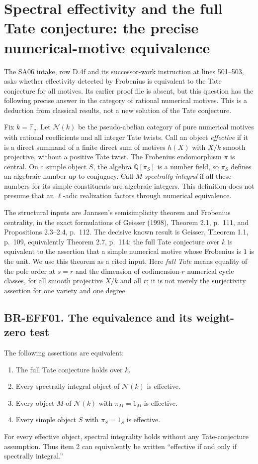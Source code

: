 \documentclass[11pt,a4paper]{article}
\theoremstyle{definition}\newtheorem{definition}[theorem]{Definition}
\theoremstyle{remark}\newtheorem{remark}[theorem]{Remark}
\begin{document}
\section{Spectral effectivity and the full Tate conjecture: the precise numerical-motive equivalence}

The SA06 intake, row D.4f and its successor-work instruction at
lines 501--503, asks whether effectivity detected by Frobenius is
equivalent to the Tate conjecture for all motives.  Its earlier proof
file is absent, but this question has the following precise answer in
the category of rational numerical motives.  This is a deduction from
classical results, not a new solution of the Tate conjecture.

Fix $k=\mathbb F_q$.  Let $\mathcal N(k)$ be the pseudo-abelian
category of pure numerical motives with rational coefficients and all
integer Tate twists.  Call an object \emph{effective} if it is a
direct summand of a finite direct sum of motives $h(X)$ with $X/k$
smooth projective, without a positive Tate twist.  The Frobenius
endomorphism $\pi$ is central.  On a simple object $S$, the algebra
$\mathbb Q[\pi_S]$ is a number field, so $\pi_S$ defines an algebraic
number up to conjugacy.  Call $M$ \emph{spectrally integral} if all
these numbers for its simple constituents are algebraic integers.
This definition does not presume that an $\ell$-adic realization
factors through numerical equivalence.

The structural inputs are Jannsen's semisimplicity theorem and
Frobenius centrality, in the exact formulations of Geisser (1998),
Theorem 2.1, p.~111, and Propositions 2.3--2.4, p.~112.
The decisive known result is Geisser, Theorem 1.1, p.~109,
equivalently Theorem 2.7, p.~114: the full Tate conjecture over $k$
is equivalent to the assertion that a simple numerical motive whose
Frobenius is $1$ is the unit.  We use this theorem as a cited input.
Here \emph{full Tate} means equality of the pole order at $s=r$
and the dimension of codimension-$r$ numerical cycle classes, for
all smooth projective $X/k$ and all $r$; it is not merely the
surjectivity assertion for one variety and one degree.

\subsection{BR-EFF01. The equivalence and its weight-zero test}
The following assertions are equivalent:
\begin{enumerate}
\item The full Tate conjecture holds over $k$.
\item Every spectrally integral object of $\mathcal N(k)$ is effective.
\item Every object $M$ of $\mathcal N(k)$ with $\pi_M=1_M$ is effective.
\item Every simple object $S$ with $\pi_S=1_S$ is effective.
\end{enumerate}
For every effective object, spectral integrality holds without
any Tate-conjecture assumption.  Thus item 2 can equivalently be
written ``effective if and only if spectrally integral.''
\end{document}
